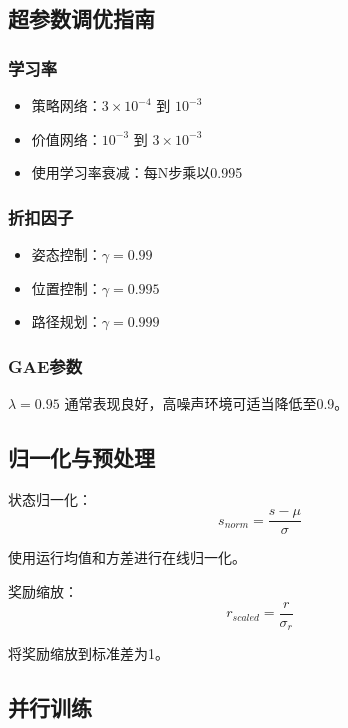 \documentclass[12pt,a4paper]{ctexart}
\begin{document}
\subsection{超参数调优指南}

\subsubsection{学习率}

\begin{itemize}
    \item 策略网络：$3\times10^{-4}$ 到 $10^{-3}$
    \item 价值网络：$10^{-3}$ 到 $3\times10^{-3}$
    \item 使用学习率衰减：每N步乘以0.995
\end{itemize}

\subsubsection{折扣因子}

\begin{itemize}
    \item 姿态控制：$\gamma = 0.99$
    \item 位置控制：$\gamma = 0.995$
    \item 路径规划：$\gamma = 0.999$
\end{itemize}

\subsubsection{GAE参数}

$\lambda = 0.95$ 通常表现良好，高噪声环境可适当降低至0.9。

\subsection{归一化与预处理}

状态归一化：
\begin{equation}
s_{norm} = \frac{s - \mu}{\sigma}
\end{equation}

使用运行均值和方差进行在线归一化。

奖励缩放：
\begin{equation}
r_{scaled} = \frac{r}{\sigma_r}
\end{equation}

将奖励缩放到标准差为1。

\subsection{并行训练}
\end{document}
